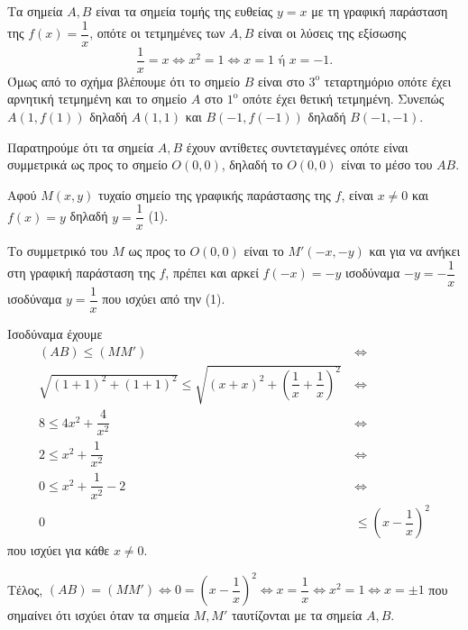 
\begin{alist}
\item Τα σημεία $A, B$ είναι τα σημεία τομής της ευθείας $y = x$ με τη γραφική παράσταση της
$f(x) = \dfrac{1}{x}$, οπότε οι τετμημένες των $A, B$ είναι οι λύσεις της εξίσωσης
\[\dfrac{1}{x} = x \Leftrightarrow x^2 = 1 \Leftrightarrow x = 1 \text{ ή } x = -1.\]
Όμως από το σχήμα βλέπουμε ότι το σημείο $B$ είναι στο $3^\text{o}$ τεταρτημόριο οπότε έχει
αρνητική τετμημένη και το σημείο $A$ στο $1^\text{o}$ οπότε έχει θετική τετμημένη. Συνεπώς
$A(1, f(1))$ δηλαδή $A(1, 1)$ και $B(-1, f(-1))$ δηλαδή $B(-1, -1)$.

Παρατηρούμε ότι τα σημεία $A, B$ έχουν αντίθετες συντεταγμένες οπότε είναι συμμετρικά
ως προς το σημείο $O(0, 0)$, δηλαδή το $O(0, 0)$ είναι το μέσο του $AB$.

\item Αφού $M(x, y)$ τυχαίο σημείο της γραφικής παράστασης της $f$, είναι $x \ne 0$ και $f(x) = y$
δηλαδή $y = \dfrac{1}{x}$ (1).

Το συμμετρικό του $M$ ως προς το $O(0, 0)$ είναι το $M'(-x, -y)$ και για να ανήκει στη γραφική
παράσταση της $f$, πρέπει και αρκεί $f(-x) = -y$ ισοδύναμα $-y = -\dfrac{1}{x}$ ισοδύναμα $y = \dfrac{1}{x}$
που ισχύει από την (1).

\item Ισοδύναμα έχουμε
\begin{align*}
(AB) \le (MM') \ &\Leftrightarrow \\
\sqrt{(1 + 1)^2 + (1 + 1)^2} \le \sqrt{(x + x)^2 + \left(\dfrac{1}{x} + \dfrac{1}{x}\right)^2} \ &\Leftrightarrow \\
8 \le 4x^2 + \dfrac{4}{x^2} \ &\Leftrightarrow \\
2 \le x^2 + \dfrac{1}{x^2} \ &\Leftrightarrow \\
0 \le x^2 + \dfrac{1}{x^2} - 2 \ &\Leftrightarrow \\
0 &\le \left(x - \dfrac{1}{x}\right)^2
\end{align*}
που ισχύει για κάθε $x \ne 0$.

Τέλος, $(AB) = (MM') \Leftrightarrow 0 = \left(x - \dfrac{1}{x}\right)^2 \Leftrightarrow x = \dfrac{1}{x} \Leftrightarrow x^2 = 1 \Leftrightarrow x = \pm 1$
που σημαίνει ότι ισχύει όταν τα σημεία $M, M'$ ταυτίζονται με τα σημεία $A, B$.
\end{alist}

